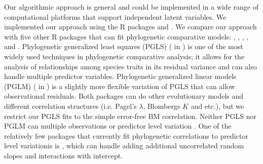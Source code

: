 Our algorithmic approach is general and could be implemented in a wide range of computational platforms that support independent latent variables. 
We implemented our approach using the R packages  \citep{bates2015fitting} and  .
We compare our approach with five other R packages that can fit phylogenetic comparative models:  \citep{pinheiro2014r},  \citep{ho2014phylolm},  \citep{pearse2015pez},  \cite{hadfield2010mcmc}, and  \citep{burkner2016brms}.
Phylogenetic generalized least squares (PGLS) ( in ) is one of the most widely used techniques in phylogenetic comparative analysis; it allows for the analysis of relationships among species traits in its residual variance and can also handle multiple predictor variables.
Phylogenetic generalized linear models (PGLM) ( in ) is a slightly more flexible variation of PGLS that can allow observational residuals.
Both packages can do other evolutionary models and different correlation structures (i.e. Pagel's $\lambda$, Blombergs $K$ and etc.), but we restrict our PGLS fits to the simple error-free BM correlation. 
Neither PGLS nor PGLM can multiple observations or predictor level variation . 
One of the relatively few packages that currently fit phylogenetic correlations to predictor level variationis is , which can handle adding additional uncorrelated random slopes and interactions with intercept.

  


